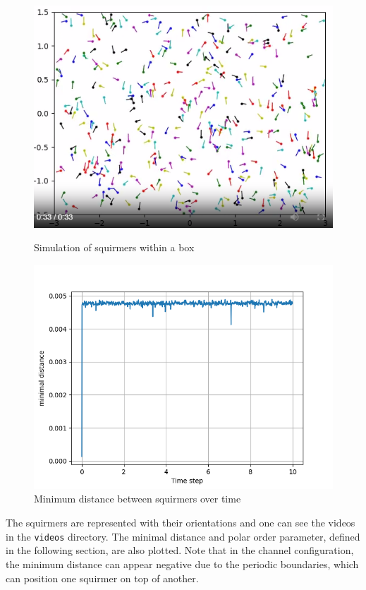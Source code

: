 \documentclass{article}
\begin{document}
\begin{figure}
    \begin{minipage}{0.49\textwidth}
        \includegraphics[width=1\textwidth]{Presentation/images/simulation.png}
        \caption{Simulation of squirmers within a box}
    \end{minipage}\hfill
    \begin{minipage}{0.49\textwidth}
        \includegraphics[width=1\textwidth]{videos/min_dist_box2.png}
        \caption{\footnotesize Minimum distance between squirmers over time}
    \end{minipage}
\end{figure}
The squirmers are represented with their orientations and one can see the videos in the \texttt{videos} directory. The minimal
distance and polar order parameter, defined in the following section, are also plotted. 
Note that in the channel configuration, the minimum distance can appear negative due to the periodic boundaries, 
which can position one squirmer on top of another.
\end{document}
